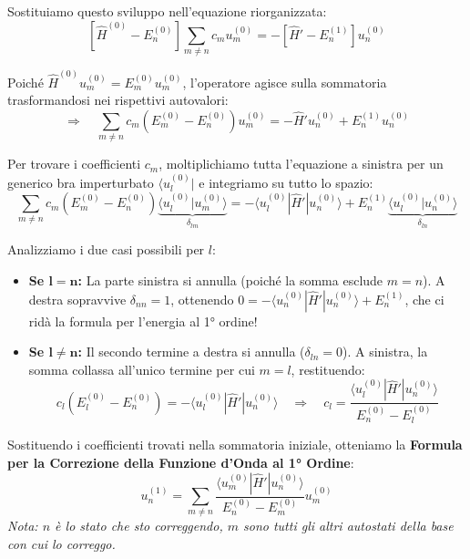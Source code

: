 \documentclass[11pt, a4paper]{article}
\begin{document}
\noindent
Sostituiamo questo sviluppo nell'equazione riorganizzata: %
\begin{equation*}
    \left[ \hat{H}^{(0)} - E_n^{(0)} \right] \sum_{m \neq n} c_m u_m^{(0)} = -\left[ \hat{H}' - E_n^{(1)} \right] u_n^{(0)} %
\end{equation*}

\noindent
Poiché $\hat{H}^{(0)} u_m^{(0)} = E_m^{(0)} u_m^{(0)}$, l'operatore agisce sulla sommatoria trasformandosi nei rispettivi autovalori: %
\begin{equation*}
    \Rightarrow \quad \sum_{m \neq n} c_m \left( E_m^{(0)} - E_n^{(0)} \right) u_m^{(0)} = - \hat{H}' u_n^{(0)} + E_n^{(1)} u_n^{(0)} %
\end{equation*}

\noindent
Per trovare i coefficienti $c_m$, moltiplichiamo tutta l'equazione a sinistra per un generico bra imperturbato $\langle u_l^{(0)} |$ e integriamo su tutto lo spazio: %
\begin{equation*}
    \sum_{m \neq n} c_m \left( E_m^{(0)} - E_n^{(0)} \right) \underbrace{ \langle u_l^{(0)} | u_m^{(0)} \rangle }_{\delta_{lm}} = - \langle u_l^{(0)} | \hat{H}' | u_n^{(0)} \rangle + E_n^{(1)} \underbrace{ \langle u_l^{(0)} | u_n^{(0)} \rangle }_{\delta_{ln}} %
\end{equation*}

Analizziamo i due casi possibili per $l$: %
\begin{itemize}
    \item \textbf{Se $\mathbf{l = n}$:} La parte sinistra si annulla (poiché la somma esclude $m=n$). A destra sopravvive $\delta_{nn}=1$, ottenendo $0 = -\langle u_n^{(0)}|\hat{H}'|u_n^{(0)}\rangle + E_n^{(1)}$, che ci ridà la formula per l'energia al 1° ordine! %
    \item \textbf{Se $\mathbf{l \neq n}$:} Il secondo termine a destra si annulla ($\delta_{ln}=0$). A sinistra, la somma collassa all'unico termine per cui $m=l$, restituendo: %
    \begin{equation*}
        c_l \left( E_l^{(0)} - E_n^{(0)} \right) = - \langle u_l^{(0)} | \hat{H}' | u_n^{(0)} \rangle \quad \Rightarrow \quad c_l = \frac{ \langle u_l^{(0)} | \hat{H}' | u_n^{(0)} \rangle }{ E_n^{(0)} - E_l^{(0)} } %
    \end{equation*}
\end{itemize}

\noindent
Sostituendo i coefficienti trovati nella sommatoria iniziale, otteniamo la \textbf{Formula per la Correzione della Funzione d'Onda al 1° Ordine}: %
\begin{equation}
    \boxed{ u_n^{(1)} = \sum_{m \neq n} \frac{\langle u_m^{(0)} | \hat{H}' | u_n^{(0)} \rangle}{E_n^{(0)} - E_m^{(0)}} u_m^{(0)} } %
\end{equation}
\textit{Nota: $n$ è lo stato che sto correggendo, $m$ sono tutti gli altri autostati della base con cui lo correggo.} %
\end{document}
